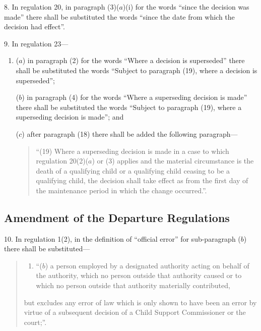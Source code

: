 \documentclass[12pt,a4paper]{article}
\begin{document}
\medskip

8.  In regulation 20, in paragraph (3)($a$)(i)  for the words “since the decision was made” there shall be substituted the words “since the date from which the decision had effect”.

\medskip

9.  In regulation 23—
\begin{enumerate}\item[]
($a$) in paragraph (2) for the words “Where a decision is superseded” there shall be substituted the words “Subject to paragraph (19), where a decision is superseded”;

($b$) in paragraph (4) for the words “Where a superseding decision is made” there shall be substituted the words “Subject to paragraph (19), where a superseding decision is made”; and

($c$) after paragraph (18) there shall be added the following paragraph—
\begin{quotation}
“(19) Where a superseding decision is made in a case to which regulation 20(2)($a$)  or (3) applies and the material circumstance is the death of a qualifying child or a qualifying child ceasing to be a qualifying child, the decision shall take effect as from the first day of the maintenance period in which the change occurred.”.
\end{quotation}
\end{enumerate}

\subsection[10--13. Amendment of the Departure Regulations]{Amendment of the Departure Regulations}

10.  In regulation 1(2), in the definition of “official error” for sub-paragraph ($b$)  there shall be substituted—
\begin{quotation}
\begin{enumerate}\item[]
“($b$) a person employed by a designated authority acting on behalf of the authority, which no person outside that authority caused or to which no person outside that authority materially contributed,
\end{enumerate}\noindent
but excludes any error of law which is only shown to have been an error by virtue of a subsequent decision of a Child Support Commissioner or the court;”.
\end{quotation}

\medskip
\end{document}
